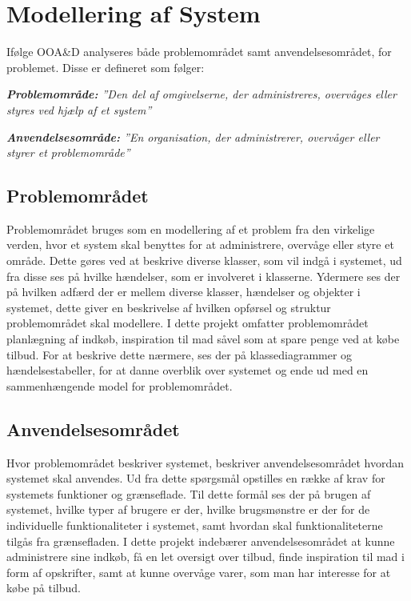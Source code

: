 \section{Modellering af System}
Ifølge OOA\&D\cite[s. 6]{OOA&D2001} analyseres både problemområdet samt anvendelsesområdet, for problemet.
Disse er defineret som følger:

\textit{\textbf{Problemområde:} ''Den del af omgivelserne, der administreres, overvåges eller styres ved hjælp af et system''}

\textit{\textbf{Anvendelsesområde:} ''En organisation, der administrerer, overvåger eller styrer et problemområde''}

\subsection{Problemområdet}
Problemområdet bruges som en modellering af et problem fra den virkelige verden, hvor et system skal benyttes for at administrere, overvåge eller styre et område. 
Dette gøres ved at beskrive diverse klasser, som vil indgå i systemet, ud fra disse ses på hvilke hændelser, som er involveret i klasserne.
Ydermere ses der på hvilken adfærd der er mellem diverse klasser, hændelser og objekter i systemet, dette giver en beskrivelse af hvilken opførsel og struktur problemområdet skal modellere.
I dette projekt omfatter problemområdet planlægning af indkøb, inspiration til mad såvel som at spare penge ved at købe tilbud.
For at beskrive dette nærmere, ses der på klassediagrammer og hændelsestabeller, for at danne overblik over systemet og ende ud med en sammenhængende model for problemområdet.
\subsection{Anvendelsesområdet}
Hvor problemområdet beskriver systemet, beskriver anvendelsesområdet hvordan systemet skal anvendes.
Ud fra dette spørgsmål opstilles en række af krav for systemets funktioner og grænseflade.
Til dette formål ses der på brugen af systemet, hvilke typer af brugere er der, hvilke brugsmønstre er der for de individuelle funktionaliteter i systemet, samt hvordan skal funktionaliteterne tilgås fra grænsefladen.
I dette projekt indebærer anvendelsesområdet at kunne administrere sine indkøb, få en let oversigt over tilbud, finde inspiration til mad i form af opskrifter, samt at kunne overvåge varer, som man har interesse for at købe på tilbud.

